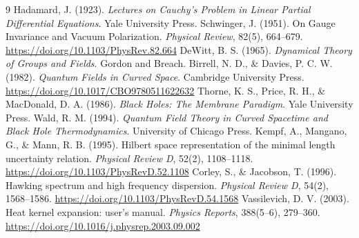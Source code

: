 \documentclass[11pt,a4paper]{article}
\begin{document}
\begin{thebibliography}{9}
 Hadamard, J. (1923). \textit{Lectures on Cauchy's Problem in Linear Partial Differential Equations}. Yale University Press.
 Schwinger, J. (1951). On Gauge Invariance and Vacuum Polarization. \textit{Physical Review}, 82(5), 664--679. \url{https://doi.org/10.1103/PhysRev.82.664}
 DeWitt, B. S. (1965). \textit{Dynamical Theory of Groups and Fields}. Gordon and Breach.
 Birrell, N. D., \& Davies, P. C. W. (1982). \textit{Quantum Fields in Curved Space}. Cambridge University Press. \url{https://doi.org/10.1017/CBO9780511622632}
 Thorne, K. S., Price, R. H., \& MacDonald, D. A. (1986). \textit{Black Holes: The Membrane Paradigm}. Yale University Press.
 Wald, R. M. (1994). \textit{Quantum Field Theory in Curved Spacetime and Black Hole Thermodynamics}. University of Chicago Press.
 Kempf, A., Mangano, G., \& Mann, R. B. (1995). Hilbert space representation of the minimal length uncertainty relation. \textit{Physical Review D}, 52(2), 1108--1118. \url{https://doi.org/10.1103/PhysRevD.52.1108}
 Corley, S., \& Jacobson, T. (1996). Hawking spectrum and high frequency dispersion. \textit{Physical Review D}, 54(2), 1568--1586. \url{https://doi.org/10.1103/PhysRevD.54.1568}
 Vassilevich, D. V. (2003). Heat kernel expansion: user's manual. \textit{Physics Reports}, 388(5--6), 279--360. \url{https://doi.org/10.1016/j.physrep.2003.09.002}
\end{thebibliography}
\end{document}
